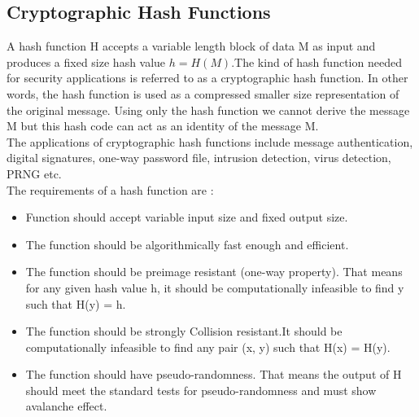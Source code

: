 \documentclass{article}
\begin{document}
\subsection{Cryptographic Hash Functions}
A hash function H accepts a variable length block of data M as input and produces a fixed size hash value $h = H(M)$.The kind of hash function needed for security applications is referred to as a cryptographic hash function. In other words, the hash function is used as a compressed smaller size representation of the original message. Using only the hash function we cannot derive the message M but this hash code can act as an identity of the message M.\\
The applications of cryptographic hash functions include message authentication, digital signatures, one-way password file, intrusion detection, virus detection, PRNG etc.\\
The requirements of a hash function are :
\begin{itemize}
    \item Function should accept variable input size and fixed output size.
    \item The function should be algorithmically fast enough and efficient.
    \item The function should be preimage resistant (one-way property). That means for any given hash value h, it should be computationally infeasible to find y such that H(y) = h.
    \item The function should be strongly Collision resistant.It should be computationally infeasible to find any pair (x, y) such that H(x) = H(y).
    \item The function should have pseudo-randomness. That means the output of H should meet the standard tests for pseudo-randomness and must show avalanche effect.
\end{itemize}
\end{document}
